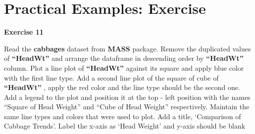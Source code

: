 \documentclass[
]{book}
\begin{document}
\section{Practical Examples: Exercise}\label{practical-examples-exercise}

\textbf{Exercise 11}

Read the \textbf{cabbages} dataset from \textbf{MASS} package. Remove the duplicated values of \textbf{``HeadWt''} and arrange the dataframe in descending order by \textbf{``HeadWt''} column. Plot a line plot of \textbf{``HeadWt''} against its square and apply blue color with the first line type. Add a second line plot of the square of cube of \textbf{``HeadWt''} , apply the red color and the line type should be the second one. Add a legend to the plot and position it at the top - left position with the names ``Square of Head Weight'' and ``Cube of Head Weight'' respectively. Maintain the same line types and colors that were used to plot. Add a title, `Comparison of Cabbage Trends'. Label the x-axis as `Head Weight' and y-axis should be blank
\end{document}
